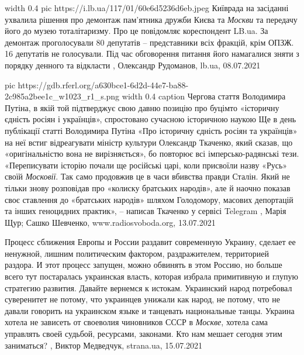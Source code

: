 \ifcmt
	width 0.4
  pic https://i.lb.ua/117/01/60e6d5236d6eb.jpeg
\fi
Київрада на засіданні ухвалила рішення про демонтаж пам'ятника дружби Києва та
\emph{Москви} та передачу його до музею тоталітаризму. Про це повідомляє
кореспондент LB.ua.  За демонтаж проголосували 80 депутатів – представники всіх
фракцій, крім ОПЗЖ.  16 депутатів не голосували. Під час обговорення питання
його намагалися зняти з порядку денного та відкласти
, 
Олександр Рудоманов, lb.ua, 08.07.2021

\ifcmt
  pic https://gdb.rferl.org/a630bce1-6d2d-44e7-ba88-2c985a2bee1c_w1023_r1_s.png
  width 0.4
	caption Чергова стаття Володимира Путіна, в якій той підтверджує свою давню позицію про буцімто «історичну єдність росіян і українців», спростовано сучасною історичною наукою
\fi
Ще в день публікації статті Володимира Путіна «Про історичну єдність росіян та
українців» на неї встиг відреагувати міністр культури Олександр Ткаченко, який
сказав, що «оригінальністю вона не вирізняється», бо повторює всі
імперсько-радянські тези.  «Переписувати історію почали ще російські царі, коли
присвоїли назву «Русь» своїй \emph{Московії}. Так само продовжив це в часи вбивства
правди Сталін. Який не тільки знову розповідав про «колиску братських народів»,
але й наочно показав своє ставлення до «братських народів» шляхом Голодомору,
масових депортацій та інших геноцидних практик», – написав Ткаченко у сервісі
Telegram
, 
Марія Щур; Сашко Шевченко, www.radiosvoboda.org, 13.07.2021

Процесс сближения Европы и России раздавит современную Украину, сделает ее
ненужной, лишним политическим фактором, раздражителем, территорией раздора. И
этот процесс запущен, можно обвинять в этом Россию, но больше всего тут
постаралась украинская власть, которая избрала примитивную и глупую стратегию
развития.  Давайте вернемся к истокам. Украинский народ потребовал суверенитет
не потому, что украинцев унижали как народ, не потому, что не давали говорить
на украинском языке и танцевать национальные танцы. Украина хотела не зависеть
от своеволия чиновников СССР в \emph{Москве}, хотела сама управлять своей
судьбой, ресурсами, законами. Кто нам мешает сегодня этим заниматься?
, 
Виктор Медведчук, strana.ua, 15.07.2021


